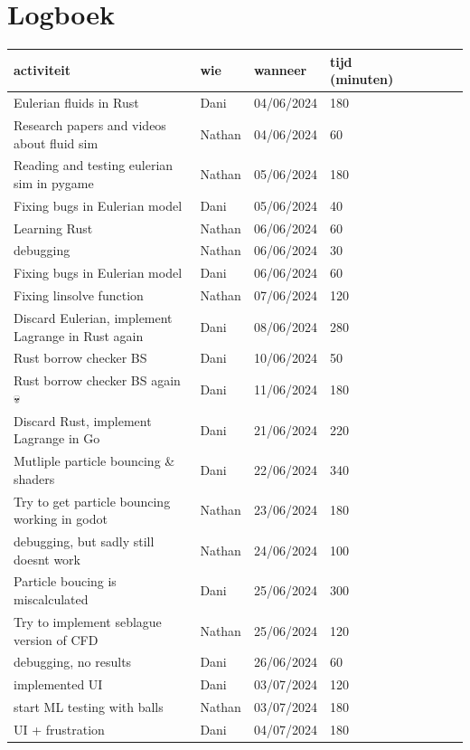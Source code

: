 \documentclass[a4paper,12pt,titlepage]{article}
\begin{document}
\section{Logboek}
\begin{longtable}{|p{200pt}|l|l|l|l|l|l|l|}
	\hline
	\textbf{activiteit} & \textbf{wie} & \textbf{wanneer} & \textbf{tijd (minuten)} \\ \hline
	Eulerian fluids in Rust & Dani & 04/06/2024 & 180 \\ \hline
	Research papers and videos about fluid sim & Nathan & 04/06/2024 & 60 \\ \hline
	Reading and testing eulerian sim in pygame & Nathan & 05/06/2024 & 180 \\ \hline
	Fixing bugs in Eulerian model & Dani & 05/06/2024 & 40 \\ \hline
	Learning Rust & Nathan & 06/06/2024 & 60 \\ \hline
	debugging & Nathan & 06/06/2024 & 30 \\ \hline
	Fixing bugs in Eulerian model & Dani & 06/06/2024 & 60 \\ \hline
	Fixing linsolve function & Nathan & 07/06/2024 & 120 \\ \hline
	Discard Eulerian, implement Lagrange in Rust again & Dani & 08/06/2024 & 280 \\ \hline
	Rust borrow checker BS & Dani & 10/06/2024 & 50 \\ \hline
	Rust borrow checker BS again 💀 & Dani & 11/06/2024 & 180 \\ \hline
	Discard Rust, implement Lagrange in Go & Dani & 21/06/2024 & 220 \\ \hline
	Mutliple particle bouncing \& shaders & Dani & 22/06/2024 & 340 \\ \hline
	Try to get particle bouncing working in godot & Nathan & 23/06/2024 & 180 \\ \hline
	debugging, but sadly still doesnt work & Nathan & 24/06/2024 & 100 \\ \hline
	Particle boucing is miscalculated & Dani & 25/06/2024 & 300 \\ \hline
	Try to implement seblague version of CFD & Nathan & 25/06/2024 & 120 \\ \hline
	debugging, no results & Dani & 26/06/2024 & 60 \\ \hline
	implemented UI & Dani & 03/07/2024 & 120 \\ \hline
	start ML testing with balls & Nathan & 03/07/2024 & 180 \\ \hline
	UI + frustration & Dani & 04/07/2024 & 180 \\ \hline

\end{longtable}
\end{document}
